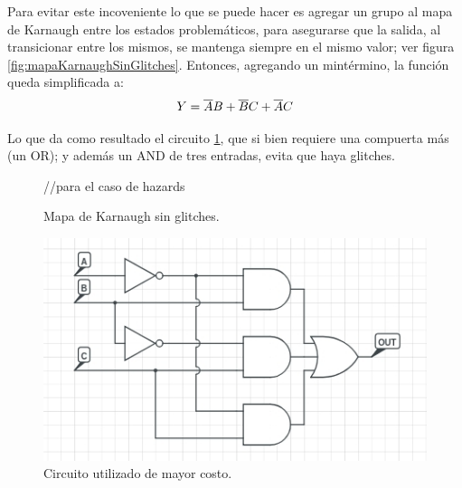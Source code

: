 \vspace{5mm}
Para evitar este incoveniente lo que se puede hacer es agregar un grupo al mapa de Karnaugh entre los estados problemáticos, 
para asegurarse que la salida, al transicionar entre los mismos, se mantenga siempre en el mismo valor; ver figura \ref{fig:mapaKarnaughSinGlitches}.
Entonces, agregando un mintérmino, la función queda simplificada a:
\vspace{4mm}
\begin{equation}
    Y=\overline{A}B+\overline{B}C+\overline{A}C
    \vspace{5mm}
\end{equation}

Lo que da como resultado el circuito \ref{fig:circuito-sin-glitches}, que si bien requiere una compuerta más (un OR); y además un AND de tres entradas, evita que haya glitches.

\vspace{5mm}
\begin{figure}[H]
    \begin{minipage}{.49\linewidth}
        \begin{center}
        \vspace{10mm}
        \begin{Karnaughvuit}
                  //para el caso de hazards
        \end{Karnaughvuit}
        \caption{Mapa de Karnaugh sin glitches.}
        \label{fig:mapaKarnaughSinGlitches}
    \end{center}
    \end{minipage}
    \begin{minipage}{.5\linewidth}
        \centering
        \includegraphics[width=.8\linewidth]{./circsinglitches.jpg}
        \caption{Circuito utilizado de mayor costo.}
        \label{fig:circuito-sin-glitches}
    \end{minipage}
\end{figure}



